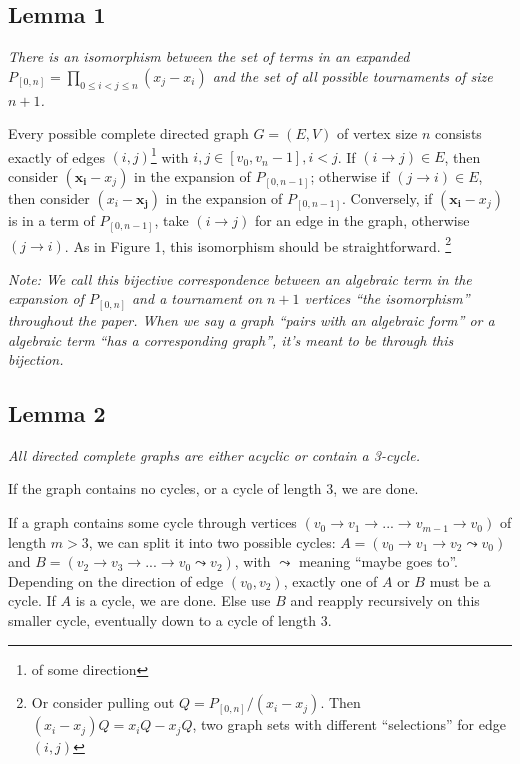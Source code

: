 \documentclass[11pt, oneside]{article} 	%
\begin{document}
\subsection{Lemma 1}

\emph{There is an isomorphism between the set of terms in an expanded $P_{[0,n]} =\prod_{0 \leq i < j \leq n}(x_j - x_i)$ and the set of all possible tournaments of size $n+1$.}

Every possible complete directed graph  $G = (E,V)$ of vertex size $n$  consists exactly of edges $(i, j)$\footnote{of some direction} with $i, j \in [v_0, v_n-1], i < j$.  If $(i \rightarrow j) \in E$, then consider $(\mathbf{x_i} - x_j)$ in the expansion of $P_{[0, n-1]}$; otherwise if $(j \rightarrow i) \in E$, then consider $(x_i - \mathbf{x_j})$ in the expansion of $P_{[0, n-1]}$.  Conversely, if $(\mathbf{x_i} - x_j)$ is in a term of $P_{[0, n-1]}$, take $(i \rightarrow j)$ for an edge in the graph, otherwise $(j \rightarrow i)$.  As in Figure 1, this isomorphism should be straightforward.
\footnote{Or consider pulling out $Q = P_{[0,n]}/(x_i - x_j)$.  Then $(x_i - x_j)Q = x_iQ - x_jQ$, two graph sets with different ``selections'' for edge $(i,j)$}

\emph{Note: We call this bijective correspondence between an algebraic term in the expansion of $P_{[0,n]}$ and a tournament on $n+1$ vertices ``the isomorphism'' throughout the paper. When we say a graph ``pairs with an algebraic form'' or a algebraic term ``has a corresponding graph'', it's meant to be through this bijection.}

\subsection{Lemma 2}

\emph{All directed complete graphs are either acyclic or contain a 3-cycle.}

If the graph contains no cycles, or a cycle of length 3, we are done.

If a graph contains some cycle through vertices $(v_0 \rightarrow v_{1} \rightarrow  ...  \rightarrow v_{m-1} \rightarrow  v_0)$ of length $m > 3$, we can split it into two possible cycles: $A = (v_0 \rightarrow  v_{1} \rightarrow v_{2} \leadsto  v_0)$ and $B = (v_{2} \rightarrow  v_{3} \rightarrow  ... \rightarrow v_{0} \leadsto v_{2} )$, with $\leadsto$ meaning ``maybe goes to''.  Depending on the direction of edge $(v_{0}, v_{2})$, exactly one of $A$ or $B$ must be a cycle.  If $A$ is a cycle, we are done.  Else use $B$ and reapply recursively on this smaller cycle, eventually down to a cycle of length 3.
\end{document}
